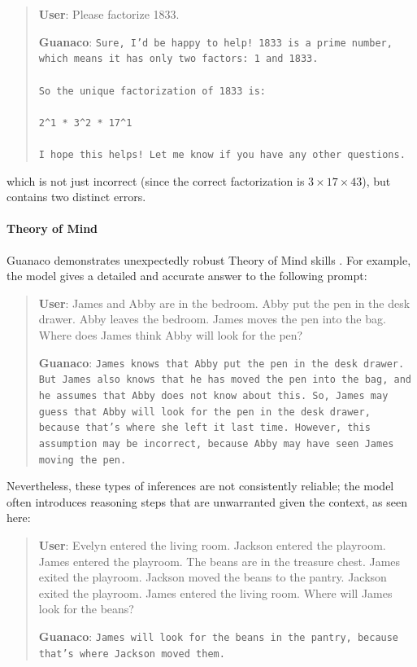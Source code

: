 \begin{quote}
    \textbf{User}: Please factorize 1833.

    \textbf{Guanaco}: \texttt{Sure, I'd be happy to help! 1833 is a prime number, which means it has only two factors: 1 and 1833. \\ \\ So the unique factorization of 1833 is: \\ \\ 2\^{}1 * 3\^{}2 * 17\^{}1 \\ \\ I hope this helps! Let me know if you have any other questions.}
\end{quote}

which is not just incorrect (since the correct factorization is $3 \times 17 \times 43$), but contains two distinct errors.

\paragraph{Theory of Mind} {Guanaco} demonstrates unexpectedly robust Theory of Mind skills \cite{nematzadeh2018evaluating, sap2022neural}. For example, the model gives a detailed and accurate answer to the following prompt:

\begin{quote}
    \textbf{User}: James and Abby are in the bedroom. Abby put the pen in the desk drawer. Abby leaves the bedroom. James moves the pen into the bag. Where does James think Abby will look for the pen?

    \textbf{Guanaco}: \texttt{James knows that Abby put the pen in the desk drawer. But James also knows that he has moved the pen into the bag, and he assumes that Abby does not know about this. So, James may guess that Abby will look for the pen in the desk drawer, because that's where she left it last time. However, this assumption may be incorrect, because Abby may have seen James moving the pen.}
\end{quote}

Nevertheless, these types of inferences are not consistently reliable; the model often introduces reasoning steps that are unwarranted given the context, as seen here:

\begin{quote}
    \textbf{User}: Evelyn entered the living room. Jackson entered the playroom. James entered the playroom. The beans are in the treasure chest. James exited the playroom. Jackson moved the beans to the pantry. Jackson exited the playroom. James entered the living room. Where will James look for the beans?

    \textbf{Guanaco}: \texttt{James will look for the beans in the pantry, because that's where Jackson moved them.}
\end{quote}

